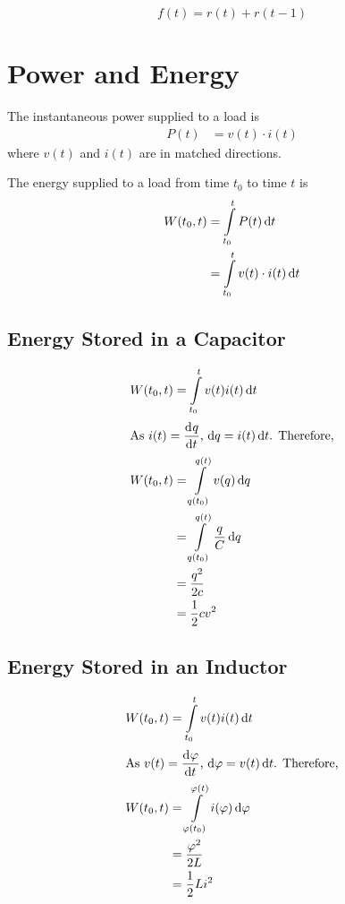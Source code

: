 \documentclass[fleqn, a4paper, 12pt, twoside]{article}
\theoremstyle{definition}
\theoremstyle{theorem}
\begin{document}
\begin{solution}
	\begin{equation*}
		f(t) = r(t) + r(t - 1)
	\end{equation*}
\end{solution}

\section{Power and Energy}

The instantaneous power supplied to a load is
\begin{align*}
	P(t) &= v(t) \cdot i(t)
\end{align*}
where $v(t)$ and $i(t)$ are in matched directions.

The energy supplied to a load from time $t_0$ to time $t$ is
\begin{align*}
	W(t_0, t) &= \int\limits_{t_0}^{t} P(t) \dif t\\
	&= \int\limits_{t_0}^{t} v(t) \cdot i(t) \dif t
\end{align*}

\subsection{Energy Stored in a Capacitor}

\begin{align*}
	W(t_0, t) &= \int\limits_{t_0}^{t} v(t) i(t) \dif t\\
	\intertext{As $i(t) = \dod{q}{t}$, $\dif q = i(t) \dif t$. Therefore,}
	W(t_0, t) &= \int\limits_{q(t_0)}^{q(t)} v(q) \dif q\\
	&= \int\limits_{q(t_0)}^{q(t)} \dfrac{q}{C} \dif q\\
	&= \dfrac{q^2}{2c}\\
	&= \dfrac{1}{2} c v^2
\end{align*}

\subsection{Energy Stored in an Inductor}

\begin{align*}
	W(t_0, t) &= \int\limits_{t_0}^{t} v(t) i(t) \dif t\\
	\intertext{As $v(t) = \dod{\varphi}{t}$, $\dif \varphi = v(t) \dif t$. Therefore,}
	W(t_0, t) &= \int\limits_{\varphi(t_0)}^{\varphi(t)} i(\varphi) \dif \varphi\\
	&= \dfrac{\varphi^2}{2 L}\\
	&= \dfrac{1}{2} L i^2
\end{align*}
\end{document}
